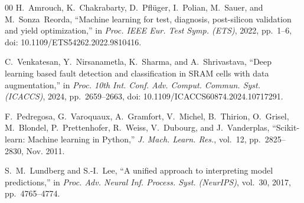 \documentclass[conference,letterpaper]{IEEEtran}
\begin{document}
\begin{thebibliography}{00}
H.~Amrouch, K.~Chakrabarty, D.~Pfl\"uger, I.~Polian, M.~Sauer, and M.~Sonza~Reorda, ``Machine learning for test, diagnosis, post-silicon validation and yield optimization,'' in \emph{Proc. IEEE Eur. Test Symp. (ETS)}, 2022, pp.~1--6, doi: 10.1109/ETS54262.2022.9810416.

C.~Venkatesan, Y.~Nirsanametla, K.~Sharma, and A.~Shrivastava, ``Deep learning based fault detection and classification in SRAM cells with data augmentation,'' in \emph{Proc. 10th Int. Conf. Adv. Comput. Commun. Syst. (ICACCS)}, 2024, pp.~2659--2663, doi: 10.1109/ICACCS60874.2024.10717291.

F.~Pedregosa, G.~Varoquaux, A.~Gramfort, V.~Michel, B.~Thirion, O.~Grisel, M.~Blondel, P.~Prettenhofer, R.~Weiss, V.~Dubourg, and J.~Vanderplas, ``Scikit-learn: Machine learning in Python,'' \emph{J. Mach. Learn. Res.}, vol.~12, pp.~2825--2830, Nov. 2011.

S.~M.~Lundberg and S.-I.~Lee, ``A unified approach to interpreting model predictions,'' in \emph{Proc. Adv. Neural Inf. Process. Syst. (NeurIPS)}, vol.~30, 2017, pp.~4765--4774.

\end{thebibliography}
\end{document}
